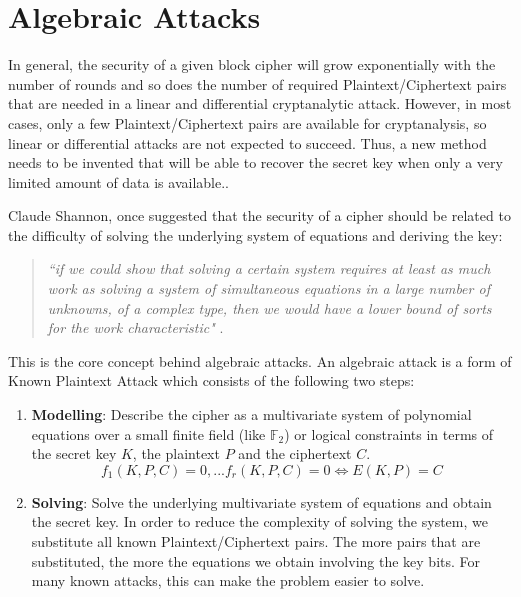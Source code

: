 \section{Algebraic Attacks} \label{sec:AA}
In general, the security of a given block cipher will grow exponentially with the number of rounds and so does the number of required Plaintext/Ciphertext pairs that are needed in a linear and differential cryptanalytic attack. However, in most cases, only a few Plaintext/Ciphertext pairs are available for cryptanalysis, so linear or differential attacks are not expected to succeed. Thus, a new method needs to be invented that will be able to recover the secret key when only a very limited amount of data is available..

Claude Shannon, once suggested that the security of a cipher should be related to the difficulty of solving the underlying system of equations and deriving the key: 

\begin{quotation}
	\textit{``if we could show that solving a certain system requires at least as much work as solving a system of simultaneous equations in a large number of unknowns, of a complex type, then we would have a lower bound of sorts for the work characteristic"} \cite{Shannon}. 
\end{quotation}
This is the core concept behind algebraic attacks. An algebraic attack is a form of Known Plaintext Attack which consists of the following two steps:

\begin{enumerate}
	\item \textbf{Modelling}: Describe the cipher as a multivariate system of polynomial equations over a small finite field (like $\mathbb{F}_2$) or logical constraints in terms of the secret key $K$, the plaintext $P$ and the ciphertext $C$. $$ {f_{1}(K,P,C)=0,...f_{r}(K,P,C)=0 \Longleftrightarrow E(K,P) = C}$$
	
	\item \textbf{Solving}: Solve the underlying multivariate system of equations and obtain the secret key. In order to reduce the complexity of solving the system, we substitute all known Plaintext/Ciphertext pairs. The more pairs that are substituted, the more the equations we obtain involving the key bits. For many known attacks, this can make the problem easier to solve.
\end{enumerate}

